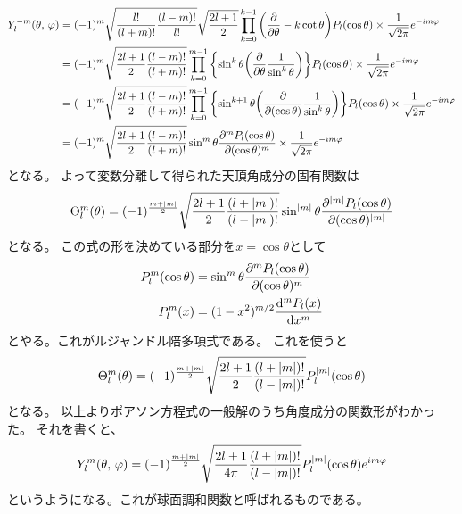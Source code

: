 \documentclass[../../master.tex]{subfiles}
\begin{document}
\begin{align}
	Y_l^{-m}(\theta,\,\varphi)
	 & =(-1)^m\sqrt{\frac{l!}{(l+m)!}\frac{(l-m)!}{l!}}\sqrt{\frac{2l+1}{2}} \prod_{k=0}^{k-1}\qty(\pdv{\theta}-k\cot\theta)P_l(\cos\theta)\times\frac{1}{\sqrt{2\pi}}e^{-im\varphi}         \\
	 & =(-1)^m\sqrt{\frac{2l+1}{2}\frac{(l-m)!}{(l+m)!}} \prod_{k=0}^{m-1}\qty{\sin^k\theta\qty(\pdv{\theta}\frac{1}{\sin^k\theta})}P_l(\cos\theta)\times\frac{1}{\sqrt{2\pi}}e^{-im\varphi} \\
	 & =(-1)^m\sqrt{\frac{2l+1}{2}\frac{(l-m)!}{(l+m)!}} \prod_{k=0}^{m-1}\qty{\sin^{k+1}\theta\qty(\pdv{(\cos\theta)}\frac{1}{\sin^k\theta})}P_l(\cos\theta)\times\frac{1}{\sqrt{2\pi}}e^{-im\varphi} \\
	 & =(-1)^m\sqrt{\frac{2l+1}{2}\frac{(l-m)!}{(l+m)!}} \sin^{m}\theta\pdv[m]{P_l(\cos\theta)}{(\cos\theta)}\times\frac{1}{\sqrt{2\pi}}e^{-im\varphi}
\end{align}
となる。
よって変数分離して得られた天頂角成分の固有関数は
\begin{equation}
	\Theta_l^m(\theta) = (-1)^{\frac{m+\abs{m}}{2}}\sqrt{\frac{2l+1}{2}\frac{(l+\abs{m})!}{(l-\abs{m})!}} \sin^{\abs{m}}\theta\pdv[\abs{m}]{P_l(\cos\theta)}{(\cos\theta)}
\end{equation}
となる。
この式の形を決めている部分を\(x=\cos\theta\)として
\begin{align}
	P_l^m(\cos\theta) &= \sin^m\theta\pdv[m]{P_l(\cos\theta)}{(\cos\theta)}\\
	P_l^m(x) &=(1-x^2)^{m/2}\dv[m]{P_l(x)}{x}
\end{align}
とやる。これがルジャンドル陪多項式である。
これを使うと
\begin{equation}
	\Theta_l^m(\theta) = (-1)^{\frac{m+\abs{m}}{2}}\sqrt{\frac{2l+1}{2}\frac{(l+\abs{m})!}{(l-\abs{m})!}} P_l^{\abs{m}}(\cos\theta)
\end{equation}
となる。
以上よりポアソン方程式の一般解のうち角度成分の関数形がわかった。
それを書くと、
\begin{equation}
	Y_l^m(\theta,\,\varphi) = (-1)^{\frac{m+\abs{m}}{2}}\sqrt{\frac{2l+1}{4\pi}\frac{(l+\abs{m})!}{(l-\abs{m})!}}P_l^{\abs{m}}(\cos\theta)e^{im\varphi}
\end{equation}
というようになる。これが球面調和関数と呼ばれるものである。
\end{document}
